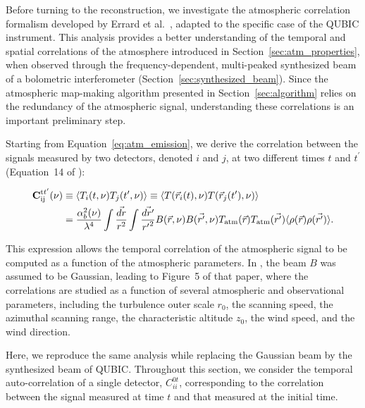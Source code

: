 \documentclass[a4paper,11pt]{article}
\begin{document}
Before turning to the reconstruction, we investigate the atmospheric correlation formalism developed by Errard et al.~\cite{errard2015}, adapted to the specific case of the QUBIC instrument. This analysis provides a better understanding of the temporal and spatial correlations of the atmosphere introduced in Section~\ref{sec:atm_properties}, when observed through the frequency-dependent, multi-peaked synthesized beam of a bolometric interferometer (Section~\ref{sec:synthesized_beam}). Since the atmospheric map-making algorithm presented in Section~\ref{sec:algorithm} relies on the redundancy of the atmospheric signal, understanding these correlations is an important preliminary step.

Starting from Equation~\ref{eq:atm_emission}, we derive the correlation between the signals measured by two detectors, denoted $i$ and $j$, at two different times $t$ and $t^\prime$ (Equation~14 of \cite{errard2015}):

\begin{align}
    \textbf{C}_\text{ij}^\text{t$t^\prime$} (\nu) &\equiv \langle T_i(t, \nu) T_j(t^\prime, \nu) \rangle \equiv \langle T(\vec{r}_i(t), \nu) T(\vec{r}_j(t^\prime), \nu) \rangle \notag \\ 
    &= \frac{\alpha_b^2(\nu)}{\lambda^4} \int\frac{\vec{dr}}{r^2} \int\frac{\vec{dr^\prime}}{{r^\prime}^2} B(\vec{r}, \nu) B(\vec{r^\prime}, \nu) T_\text{atm}(\vec{r}) T_\text{atm}(\vec{r^\prime}) \langle \rho(\vec{r}) \rho(\vec{r^\prime}) \rangle .
\end{align}

This expression allows the temporal correlation of the atmospheric signal to be computed as a function of the atmospheric parameters. In \cite{errard2015}, the beam $B$ was assumed to be Gaussian, leading to Figure~5 of that paper, where the correlations are studied as a function of several atmospheric and observational parameters, including the turbulence outer scale $r_0$, the scanning speed, the azimuthal scanning range, the characteristic altitude $z_0$, the wind speed, and the wind direction.

Here, we reproduce the same analysis while replacing the Gaussian beam by the synthesized beam of QUBIC. Throughout this section, we consider the temporal auto-correlation of a single detector, $C_{ii}^{0t}$, corresponding to the correlation between the signal measured at time $t$ and that measured at the initial time.
\end{document}

